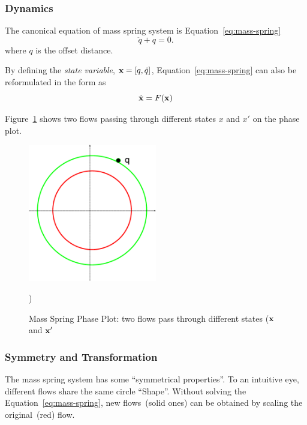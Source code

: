 \subsubsection*{Dynamics}
The canonical equation of mass spring system is Equation~\ref{eq:mass-spring}
\begin{equation}
\label{eq:mass-spring}
\ddot{q}+q=0.
\end{equation}
where $q$ is the offset distance.

By defining the \emph{state variable}, $\mathbf{x}=[q,\dot{q}]$, Equation~\ref{eq:mass-spring} can also be reformulated in the form as
\[
\dot{\mathbf{x}}=F(\mathbf{x})
\]

Figure~\ref{fig:massSpringPhasePlot} shows two flows passing through different states $x$ and $x'$ on the phase plot.


\begin{figure}[!htbp]
  \begin{center}
     \includegraphics[width=0.5\textwidth]{MassSpringPhasePlot}
    \caption{Mass Spring Phase Plot: two flows pass through different states ($\mathbf{x}$ and ${\mathbf{x}}'$})
    \label{fig:massSpringPhasePlot}  
  \end{center}
\end{figure}

\subsubsection*{Symmetry and Transformation}

The mass spring system has some ``symmetrical properties''.
To an intuitive eye, different flows share the same circle ``Shape''.
Without solving the Equation~\ref{eq:mass-spring}, new flows~(solid ones) can be obtained by scaling the original~(red) flow.

